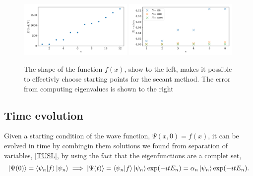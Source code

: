 \documentclass{article}
\begin{document}
    \begin{figure}[ht]
        \centering
        \includegraphics[width=0.49\textwidth]{box_w_barrier/eigenvals}
        \includegraphics[width=0.49\textwidth]{box_w_barrier/roots_error.pdf}
        \caption{The shape of the function $f(x)$, show to the left, makes it possible to effectivly choose starting points for the secant method. The error from computing eigenvalues is shown to the right}
        \label{fig:eigenvals box w barrier}
    \end{figure}


\subsection*{Time evolution}
    Given a starting condition of the wave function, $\Psi(x, 0) = f(x)$, it can be evolved in time by combingin them solutions we found from separation of variables, \ref{TUSL}, by using the fact that the eigenfunctions are a complet set,
    \begin{equation*}
        \ket{\Psi(0)} = \braket{\psi_n}{f}\ket{\psi_n} \implies \ket{\Psi(t)} = \braket{\psi_n}{f}\ket{\psi_n} \exp(-itE_n) = \alpha_n \ket{\psi_n} \exp(-itE_n).
    \end{equation*}
\end{document}
